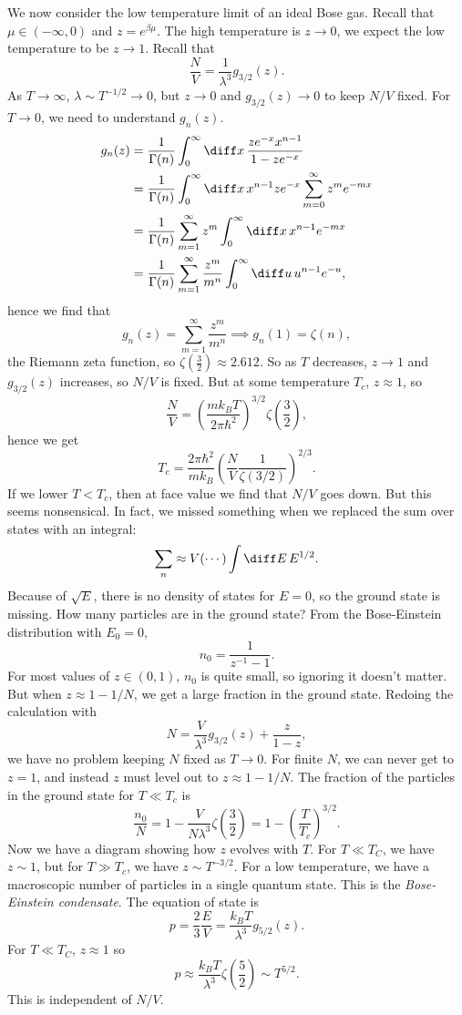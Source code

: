 \documentclass[12pt]{article}
\begin{document}
We now consider the low temperature limit of an ideal Bose gas. Recall that $\mu \in (-\infty, 0)$ and $z = e^{\beta \mu}$. The high temperature is $z \to 0$, we expect the low temperature to be $z \to 1$. Recall that
\[
\frac{N}{V} = \frac{1}{\lambda ^3} g_{3/2}(z).
\]
As $T \to \infty$, $\lambda \sim T^{-1/2} \to 0$, but $z \to 0$ and $g_{3/2}(z) \to 0$ to keep $N/V$ fixed. For $T \to 0$, we need to understand $g_n(z)$.
\begin{align*}
	g_n(z) &= \frac{1}{\Gamma(n)} \int_0^\infty \diff x \, \frac{ze^{-x} x^{n-1}}{1 - z e^{-x}} \\
	       &= \frac{1}{\Gamma(n)} \int_0^\infty \diff x \, x^{n-1} z e^{-x} \sum_{m = 0}^{\infty} z^m e^{-mx} \\
	       &= \frac{1}{\Gamma(n)}\sum_{m = 1}^\infty z^m \int_0^\infty \diff x\, x^{n-1} e^{-mx} \\
	       &= \frac{1}{\Gamma(n)} \sum_{m = 1}^\infty \frac{z^m}{m^n} \int_0^\infty \diff u \, u^{n-1} e^{-u},
\end{align*}
hence we find that
\[
g_n(z) = \sum_{m = 1}^\infty \frac{z^m}{m^n} \implies g_n(1) = \zeta(n),
\]
the Riemann zeta function, so $\zeta(\frac{3}{2}) \approx 2.612$. So as $T$ decreases, $z \to 1$ and $g_{3/2}(z)$ increases, so $N/V$ is fixed. But at some temperature $T_c$, $z \approx 1$, so
\[
\frac{N}{V} = \left( \frac{m k_B T}{ 2 \pi \hbar^2} \right)^{3/2} \zeta \left( \frac{3}{2} \right),
\]
hence we get
\[
T_c = \frac{2 \pi \hbar^2}{m k_B} \left( \frac{N}{V} \frac{1}{\zeta(3/2)} \right)^{2/3}.
\]
If we lower $T < T_c$, then at face value we find that $N/V$ goes down. But this seems nonsensical. In fact, we missed something when we replaced the sum over states with an integral:
\[
\sum_n \approx V(\cdots) \int \diff E \, E^{1/2}.
\]
Because of $\sqrt E$, there is no density of states for $E = 0$, so the ground state is missing. How many particles are in the ground state? From the Bose-Einstein distribution with $E_0 = 0$,
\[
n_0 = \frac{1}{z^{-1} - 1}.
\]
For most values of $z \in (0, 1)$, $n_0$ is quite small, so ignoring it doesn't matter. But when $z \approx 1 - 1/N$, we get a large fraction in the ground state. Redoing the calculation with
\[
N = \frac{V}{\lambda^3} g_{3/2}(z) + \frac{z}{1-z},
\]
we have no problem keeping $N$ fixed as $T \to 0$. For finite $N$, we can never get to $z = 1$, and instead $z$ must level out to $z \approx 1 - 1/N$. The fraction of the particles in the ground state for $T \ll T_c$ is
\[
\frac{n_0}{N} = 1 - \frac{V}{N \lambda^3} \zeta \left( \frac{3}{2} \right) = 1 - \left( \frac{T}{T_c}\right)^{3/2}.
\]
Now we have a diagram showing how $z$ evolves with $T$. For $T \ll T_C$, we have $z \sim 1$, but for $T \gg T_c$, we have $z \sim T^{-3/2}$. For a low temperature, we have a macroscopic number of particles in a single quantum state. This is the \emph{Bose-Einstein condensate}. The equation of state is
\[
p = \frac{2}{3} \frac{E}{V} = \frac{k_B T}{\lambda ^3}g_{5/2}(z).
\]
For $T \ll T_C$, $z \approx 1$ so
\[
p \approx \frac{k_B T}{\lambda^3} \zeta\left( \frac{5}{2} \right) \sim T^{5/2}.
\]
This is independent of $N/V$.
\end{document}
